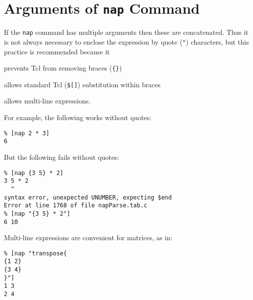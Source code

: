
\section{Arguments of \texttt{nap} Command}

If the 
    \texttt{nap} command has multiple arguments then these are
    concatenated. Thus it is not always necessary to enclose the
    expression by quote (\texttt{"}) characters, but this practice is recommended
    because it
\begin{bullets}
      \item prevents Tcl from removing braces (\texttt{\{\}})
      \item allows standard Tcl (\texttt{\$[]}) substitution within braces
      \item allows multi-line expressions.
\end{bullets}
For example, the following works without quotes:
\begin{verbatim}
% [nap 2 * 3]
6
\end{verbatim}

But the following fails without quotes:
    \begin{verbatim}
% [nap {3 5} * 2]
3 5 * 2
  ^
syntax error, unexpected UNUMBER, expecting $end
Error at line 1768 of file napParse.tab.c
% [nap "{3 5} * 2"]
6 10
\end{verbatim}

Multi-line expressions are convenient for matrices, as in:
    \begin{verbatim}
% [nap "transpose{
{1 2}
{3 4}
}"]
1 3
2 4
\end{verbatim}


